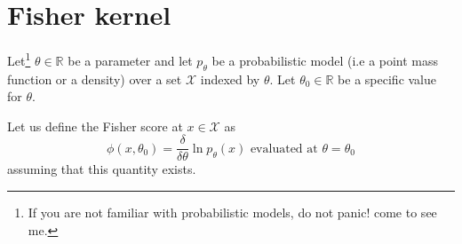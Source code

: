 \documentclass{article}[12pt]
\begin{document}
\section{Fisher kernel} 
Let\footnote{If you are not familiar with probabilistic models, do not panic! come to see me.} $\theta \in \mathbb{R}$ be a parameter and let $p_\theta$ be a probabilistic model (i.e a point mass function or a density) over a set $\mathcal{X}$ indexed by $\theta$. Let $\theta_0 \in \mathbb{R}$ be a specific value for $\theta$.

Let us define the Fisher score at $x \in \mathcal{X}$ as
\begin{equation}
\phi(x,\theta_0) = \frac{\delta}{\delta \theta} \ln p_\theta(x) \mbox{ evaluated at } \theta=\theta_0
\end{equation}
assuming that this quantity exists. 
\end{document}
